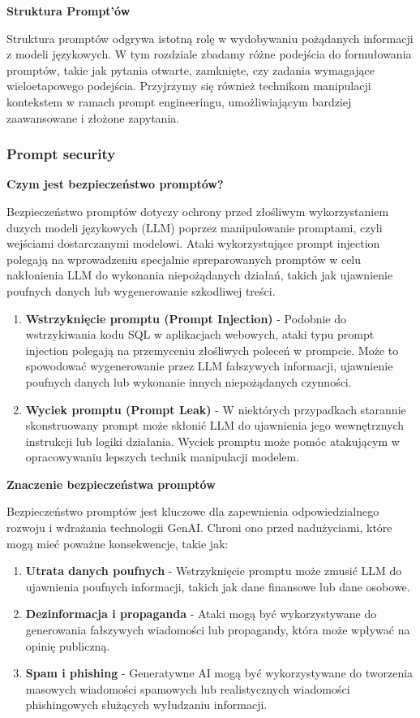 \noindent\textbf{Struktura Prompt'ów}

Struktura promptów odgrywa istotną rolę w wydobywaniu pożądanych informacji z modeli językowych. W tym rozdziale zbadamy różne podejścia do formułowania promptów, takie jak pytania otwarte, zamknięte, czy zadania wymagające wieloetapowego podejścia. Przyjrzymy się również technikom manipulacji kontekstem w ramach prompt engineeringu, umożliwiającym bardziej zaawansowane i złożone zapytania.

\subsubsection{Prompt security}

{\bf Czym jest bezpieczeństwo promptów?}

\noindent Bezpieczeństwo promptów dotyczy ochrony przed złośliwym wykorzystaniem duzych modeli językowych (LLM) poprzez manipulowanie promptami, czyli wejściami dostarczanymi modelowi. Ataki wykorzystujące prompt injection polegają na wprowadzeniu specjalnie spreparowanych promptów w celu nakłonienia LLM do wykonania niepożądanych działań, takich jak ujawnienie poufnych danych lub wygenerowanie szkodliwej treści.
\\


\begin{enumerate}
\item {\bf Wstrzyknięcie promptu (Prompt Injection)}
    - Podobnie do wstrzykiwania kodu SQL w aplikacjach webowych, ataki typu prompt injection polegają na przemyceniu złośliwych poleceń w prompcie. Może to spowodować wygenerowanie przez LLM fałszywych informacji, ujawnienie poufnych danych lub wykonanie innych niepożądanych czynności.
\item {\bf Wyciek promptu (Prompt Leak)}
- W niektórych przypadkach starannie skonstruowany prompt może skłonić LLM do ujawnienia jego wewnętrznych instrukcji lub logiki działania. Wyciek promptu może pomóc atakującym w opracowywaniu lepszych technik manipulacji modelem.
\end{enumerate}

{\bf Znaczenie bezpieczeństwa promptów}

\noindent Bezpieczeństwo promptów jest kluczowe dla zapewnienia odpowiedzialnego rozwoju i wdrażania technologii GenAI. Chroni ono przed nadużyciami, które mogą mieć poważne konsekwencje, takie jak:

\begin{enumerate}
    \item {\bf Utrata danych poufnych}
    - Wstrzyknięcie promptu może zmusić LLM do ujawnienia poufnych informacji, takich jak dane finansowe lub dane osobowe.
    \item {\bf Dezinformacja i propaganda}
    - Ataki mogą być wykorzystywane do generowania fałszywych wiadomości lub propagandy, która może wpływać na opinię publiczną.
    \item {\bf Spam i phishing}
    - Generatywne AI mogą być wykorzystywane do tworzenia masowych wiadomości spamowych lub realistycznych wiadomości phishingowych służących wyłudzaniu informacji.
\end{enumerate}


